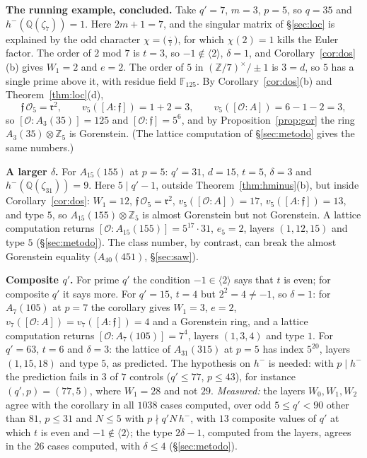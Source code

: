 \documentclass[11pt,a4paper]{article}
\theoremstyle{definition}
\newcommand{\ZZ}{\mathbb{Z}}
\newcommand{\QQ}{\mathbb{Q}}
\newcommand{\FF}{\mathbb{F}}
\newcommand{\cO}{\mathcal{O}}
\newcommand{\cf}{\mathfrak{f}}
\newcommand{\rad}{\mathfrak{r}}
\begin{document}
\noindent\textbf{The running example, concluded.} Take $q'=7$, $m=3$, $p=5$, so $q=35$ and $h^-(\QQ(\zeta_7))=1$. Here
$2m+1=7$, and the singular matrix of \S\ref{sec:loc} is explained by the odd character $\chi=\bigl(\frac{\cdot}{7}\bigr)$,
for which $\chi(2)=1$ kills the Euler factor. The
order of $2$ mod $7$ is $t=3$, so $-1\notin\langle2\rangle$, $\delta=1$, and Corollary~\ref{cor:dos}(b) gives $W_1=2$
and $e=2$. The order of $5$
in $(\ZZ/7)^\times/\pm1$ is $3=d$, so $5$ has a single prime above it, with residue field $\FF_{125}$. By
Corollary~\ref{cor:dos}(b) and Theorem~\ref{thm:loc}(d),
\[
\cf\,\cO_5=\rad^2,\qquad v_5([A:\cf])=1+2=3,\qquad v_5([\cO:A])=6-1-2=3 ,
\]
so $[\cO:A_3(35)]=125$ and $[\cO:\cf]=5^6$, and by Proposition~\ref{prop:gor} the ring $A_3(35)\otimes\ZZ_5$ is Gorenstein. (The lattice computation
of \S\ref{sec:metodo} gives the same numbers.)

\noindent\textbf{A larger $\delta$.} For $A_{15}(155)$ at $p=5$: $q'=31$, $d=15$, $t=5$, $\delta=3$ and
$h^-(\QQ(\zeta_{31}))=9$. Here $5\mid q'-1$, outside Theorem~\ref{thm:hminus}(b), but inside Corollary~\ref{cor:dos}:
$W_1=12$, $\cf\,\cO_5=\rad^2$, $v_5([\cO:A])=17$, $v_5([A:\cf])=13$, and type $5$, so $A_{15}(155)\otimes\ZZ_5$ is almost
Gorenstein but not Gorenstein. A lattice computation returns $[\cO:A_{15}(155)]=5^{17}\cdot31$, $e_5=2$, layers
$(1,12,15)$ and type $5$ (\S\ref{sec:metodo}). The class number, by contrast, can break the almost Gorenstein equality
($A_{40}(451)$, \S\ref{sec:saw}).

\noindent\textbf{Composite $q'$.} For prime $q'$ the condition $-1\in\langle2\rangle$ says that $t$ is even; for composite
$q'$ it says more. For $q'=15$, $t=4$ but $2^2=4\ne-1$, so $\delta=1$: for $A_7(105)$ at $p=7$ the corollary gives
$W_1=3$, $e=2$, $v_7([\cO:A])=v_7([A:\cf])=4$ and a Gorenstein ring, and a lattice computation returns
$[\cO:A_7(105)]=7^4$, layers $(1,3,4)$ and type $1$. For $q'=63$, $t=6$ and $\delta=3$: the lattice of $A_{31}(315)$ at
$p=5$ has index $5^{20}$, layers $(1,15,18)$ and type $5$, as predicted. The hypothesis on $h^-$ is needed: with
$p\mid h^-$ the prediction fails in $3$ of $7$ controls ($q'\le77$, $p\le43$), for instance $(q',p)=(77,5)$, where $W_1=28$ and not $29$.
\emph{Measured:} the layers $W_0,W_1,W_2$ agree with the corollary in all $1038$ cases computed, over odd $5\le q'<90$ other than $81$,
$p\le31$ and $N\le5$ with $p\nmid q'N\,h^-$, with $13$ composite values of $q'$ at which $t$ is even and $-1\notin\langle2\rangle$; the type
$2\delta-1$, computed from the layers, agrees in the $26$ cases computed, with $\delta\le4$ (\S\ref{sec:metodo}).
\end{document}
